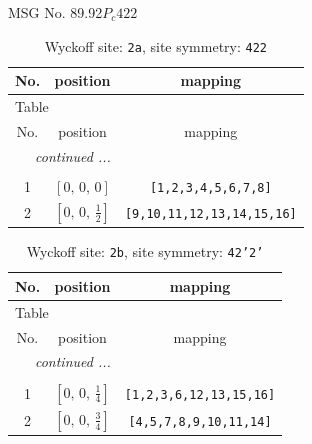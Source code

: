 \documentclass[fleqn,8pt]{jsarticle}
\begin{document}
\setcounter{MaxMatrixCols}{32}

\renewcommand{\tablename}{Table~}
\renewcommand{\figurename}{Figure~}
\begin{center}
\LARGE
MSG No. 89.92\quad$P_{c}422$
\end{center}
\renewcommand{\arraystretch}{1.2}
\begin{longtable}{ccc}
\caption{Wyckoff site: {\tt 2a}, site symmetry: {\tt 422}}
 \\
 \hline \hline
No. & position & mapping \\ \hline \endfirsthead

\multicolumn{2}{l}{\tablename\ \thetable{}} \\
 \hline \hline
No. & position & mapping \\ \hline \endhead

 \hline \hline
\multicolumn{2}{r}{\footnotesize\it continued ...} \\ \endfoot

 \hline \hline
\multicolumn{2}{r}{} \\ \endlastfoot

1 & $\left[ 0,\, 0,\, 0 \right]$ & {\tt [1,2,3,4,5,6,7,8]} \\ \hline
2 & $\left[ 0,\, 0,\, \frac{1}{2} \right]$ & {\tt [9,10,11,12,13,14,15,16]} \\
\end{longtable}
\renewcommand{\arraystretch}{1.2}
\begin{longtable}{ccc}
\caption{Wyckoff site: {\tt 2b}, site symmetry: {\tt 42'2'}}
 \\
 \hline \hline
No. & position & mapping \\ \hline \endfirsthead

\multicolumn{2}{l}{\tablename\ \thetable{}} \\
 \hline \hline
No. & position & mapping \\ \hline \endhead

 \hline \hline
\multicolumn{2}{r}{\footnotesize\it continued ...} \\ \endfoot

 \hline \hline
\multicolumn{2}{r}{} \\ \endlastfoot

1 & $\left[ 0,\, 0,\, \frac{1}{4} \right]$ & {\tt [1,2,3,6,12,13,15,16]} \\ \hline
2 & $\left[ 0,\, 0,\, \frac{3}{4} \right]$ & {\tt [4,5,7,8,9,10,11,14]} \\
\end{longtable}
\end{document}
